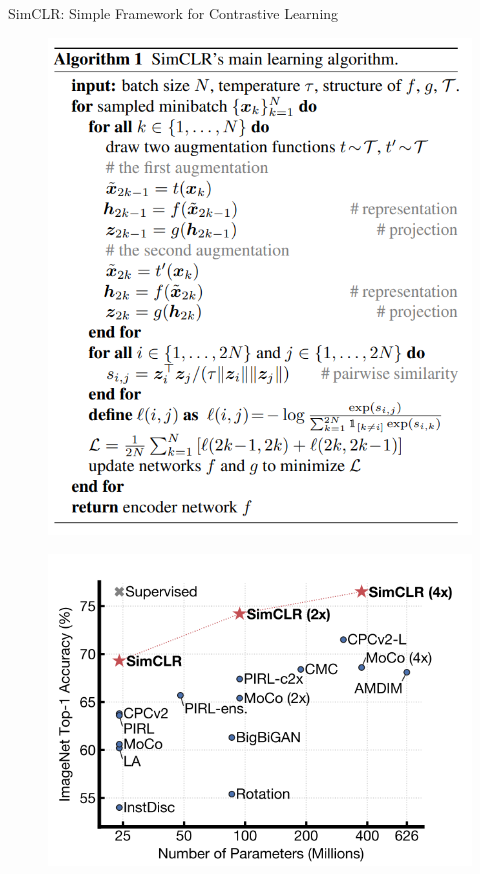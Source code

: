 \begin{frame}[allowframebreaks]{SimCLR: Simple Framework for Contrastive Learning}
\begin{figure}
    \centering
    \includegraphics[width=\linewidth,height=0.9\textheight,keepaspectratio]{images/contrastive/slide_74_1_img.png}
\end{figure}

\framebreak

\begin{figure}
    \centering
    \includegraphics[width=\linewidth,height=0.9\textheight,keepaspectratio]{images/contrastive/slide_75_1_img.png}
\end{figure}


\end{frame}
